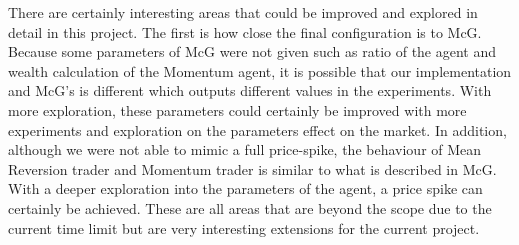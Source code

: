 There are certainly interesting areas that could be improved and explored in detail in this project. The first is how close the final configuration is to McG. Because some parameters of McG were not given such as ratio of the agent and wealth calculation of the Momentum agent, it is possible that our implementation and McG's is different which outputs different values in the experiments. With more exploration, these parameters could certainly be improved with more experiments and exploration on the parameters effect on the market. In addition, although we were not able to mimic a full price-spike, the behaviour of Mean Reversion trader and Momentum trader is similar to what is described  in McG. With a deeper exploration into the parameters of the agent, a price spike can certainly be achieved. These are all areas that are beyond the scope due to the current time limit but are very interesting extensions for the current project. 